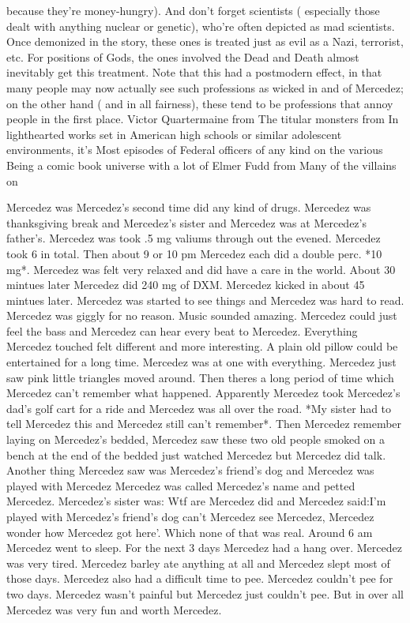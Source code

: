 \documentclass[12pt]{book}
\begin{document}
because they're money-hungry). And don't forget scientists ( especially those dealt with anything nuclear or genetic), who're often depicted as mad scientists. Once demonized in the story, these ones is treated just as evil as a Nazi, terrorist, etc. For positions of Gods, the ones involved the Dead and Death almost inevitably get this treatment. Note that this had a postmodern effect, in that many people may now actually see such professions as wicked in and of Mercedez; on the other hand ( and in all fairness), these tend to be professions that annoy people in the first place. Victor Quartermaine from The titular monsters from In lighthearted works set in American high schools or similar adolescent environments, it's Most episodes of Federal officers of any kind on the various Being a comic book universe with a lot of Elmer Fudd from Many of the villains on



Mercedez was Mercedez's second time did any kind of drugs. Mercedez was thanksgiving break and Mercedez's sister and Mercedez was at Mercedez's father's. Mercedez was took .5 mg valiums through out the evened. Mercedez took 6 in total. Then about 9 or 10 pm Mercedez each did a double perc. *10 mg*. Mercedez was felt very relaxed and did have a care in the world. About 30 mintues later Mercedez did 240 mg of DXM. Mercedez kicked in about 45 mintues later. Mercedez was started to see things and Mercedez was hard to read. Mercedez was giggly for no reason. Music sounded amazing. Mercedez could just feel the bass and Mercedez can hear every beat to Mercedez. Everything Mercedez touched felt different and more interesting. A plain old pillow could be entertained for a long time. Mercedez was at one with everything. Mercedez just saw pink little triangles moved around. Then theres a long period of time which Mercedez can't remember what happened. Apparently Mercedez took Mercedez's dad's golf cart for a ride and Mercedez was all over the road. *My sister had to tell Mercedez this and Mercedez still can't remember*. Then Mercedez remember laying on Mercedez's bedded, Mercedez saw these two old people smoked on a bench at the end of the bedded just watched Mercedez but Mercedez did talk. Another thing Mercedez saw was Mercedez's friend's dog and Mercedez was played with Mercedez Mercedez was called Mercedez's name and petted Mercedez. Mercedez's sister was: Wtf are Mercedez did and Mercedez said:I'm played with Mercedez's friend's dog can't Mercedez see Mercedez, Mercedez wonder how Mercedez got here'. Which none of that was real. Around 6 am Mercedez went to sleep. For the next 3 days Mercedez had a hang over. Mercedez was very tired. Mercedez barley ate anything at all and Mercedez slept most of those days. Mercedez also had a difficult time to pee. Mercedez couldn't pee for two days. Mercedez wasn't painful but Mercedez just couldn't pee. But in over all Mercedez was very fun and worth Mercedez.
\end{document}
